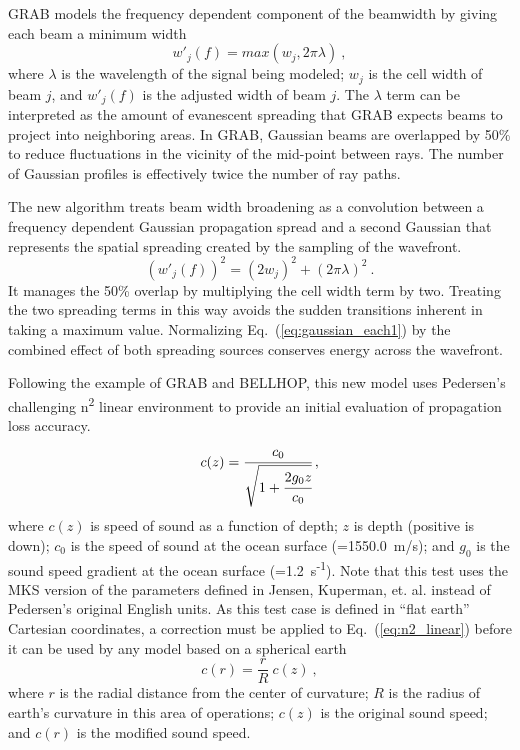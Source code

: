 \documentclass{ws-jca}
\begin{document}
GRAB\cite{Weinberg1996} models the frequency dependent component of the
beamwidth by giving each beam a minimum width
\begin{equation}
  w'_j(f) = max \left( w_j, 2 \pi \lambda \right) \:, 
  \label{eq:weinberg_width}
\end{equation}
where 
\(\lambda\) is the wavelength of the signal being modeled;
\(w_j\) is the cell width of beam $j$, and
\(w'_j(f)\) is the adjusted width of beam $j$.
The \(\lambda\) term can be interpreted as the amount of
evanescent spreading that GRAB expects beams to project into neighboring areas.
In GRAB, Gaussian beams are overlapped by 50\% to reduce fluctuations in the vicinity of the mid-point between rays.\cite{Weinberg1996b}  The number of Gaussian profiles is effectively twice the number of ray paths. 

The new algorithm treats beam width broadening as a convolution between a
frequency dependent Gaussian propagation spread and a second Gaussian that
represents the spatial spreading created by the sampling of the wavefront.
\begin{equation}
	(w'_j(f))^2 = \left( 2 w_j \right)^2 + \left( 2 \pi \lambda \right)^2 \:.
	\label{eq:new_width}
\end{equation}
It manages the 50\% overlap by multiplying the cell width term by two.
Treating the two spreading terms in this way avoids the sudden transitions
inherent in taking a maximum value. Normalizing
Eq.~(\ref{eq:gaussian_each1}) by the combined effect of both spreading
sources conserves energy across the wavefront.

Following the example of GRAB and BELLHOP, this new model uses Pedersen's
challenging n\textsuperscript{2} linear environment to provide an initial
evaluation of propagation loss accuracy.\cite{Pedersen1972}
\begin{equation}
	c(z) = \cfrac{c_0}{\sqrt{1+\cfrac{2 g_0 z}{c_0}}} \:,
	\label{eq:n2_linear}
\end{equation}
where
\(c(z)\) is speed of sound as a function of depth;
\(z\) is depth (positive is down);
\(c_0\) is the speed of sound at the ocean surface (=1550.0~m/s); and
\(g_0\) is the sound speed gradient at the ocean surface
(=1.2~s\textsuperscript{-1}).
Note that this test uses the MKS version of the parameters defined in
Jensen, Kuperman, et. al.\cite{Jensen1994} instead of Pedersen's original
English units. As this test case is defined in ``flat earth'' Cartesian coordinates, a
correction must be applied to Eq.~(\ref{eq:n2_linear})
before it can be used by any model based on a spherical earth\cite{Pekeris1946}
\begin{equation}
	c(r) = \frac{r}{R} \: c(z) \:, 
	\label{eq:n2_correction}
\end{equation}
where
$r$ is the radial distance from the center of curvature;
$R$ is the radius of earth's curvature in this area of operations;
$c(z)$ is the original sound speed; and
$c(r)$ is the modified sound speed.
\end{document}
